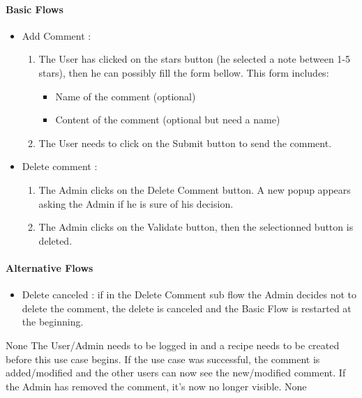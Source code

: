 {  \paragraph{Basic Flows}
  \begin{itemize}
    \item Add Comment :
    \begin{enumerate}
      \item The User has clicked on the stars button (he selected a note between 1-5 stars), then he can possibly fill the form bellow. This form includes:
      \begin{itemize}
        \item Name of the comment (optional)
        \item Content of the comment (optional but need a name)
      \end{itemize}
      \item The User needs to click on the Submit button to send the comment.
    \end{enumerate}
    \item Delete comment :
    \begin{enumerate}
      \item The Admin clicks on the Delete Comment button. A new popup appears asking the Admin if he is sure of his decision.
      \item The Admin clicks on the Validate button, then the selectionned button is deleted.
    \end{enumerate}
  \end{itemize}

  \paragraph{Alternative Flows}
  \begin{itemize}
    \item Delete canceled : if in the Delete Comment sub flow the Admin decides not to delete the comment, the delete is canceled and the Basic Flow is restarted at the beginning.
  \end{itemize}
}
{None}
{The User/Admin needs to be logged in and a recipe needs to be created before this use case begins.}
{If the use case was successful, the comment is added/modified and the other users can now see the new/modified comment. If the Admin has removed the comment, it’s now no longer visible.
}
{None}

